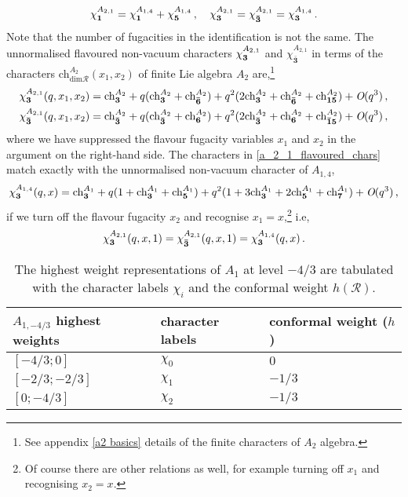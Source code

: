 \documentclass[a4paper,12pt]{article}
\begin{document}
\begin{equation}
    \chi_{\bf 1}^{A_{2,1}}=\chi_{\bf 1}^{A_{1,4}}+\chi_{\bf 5}^{A_{1,4}}\, ,\quad \chi_{\bf 3}^{A_{2,1}}=\chi_{\mathbf{\bar 3}}^{A_{2,1}}=\chi_{\bf 3}^{A_{1,4}}\, .
\end{equation}
Note that the number of fugacities in the identification is not the same. The unnormalised flavoured non-vacuum characters $\chi_{\bf 3}^{A_{2,1}}$ and $\chi_{\mathbf{\bar 3}}^{A_{2,1}}$ in terms of the characters $\mathrm{ch}^{A_2}_{\mathrm{dim}\mathcal{R}}(x_1,x_2)$ of finite Lie algebra $A_{2}$ are,\footnote{See appendix \ref{a2 basics} details of the finite characters of $A_2$ algebra.}
\begin{align}\label{a_2_1_flavoured_chars}
    \chi_{\bf 3}^{A_{2,1}}(q,x_1,x_2)&=\mathrm{ch}^{A_2}_{\bf 3}+q(\mathrm{ch}^{A_2}_{\bf 3}+\mathrm{ch}^{A_2}_{\mathbf{\bar 6}})+q^2(2\mathrm{ch}^{A_2}_{\bf 3}+\mathrm{ch}^{A_2}_{\mathbf{\bar 6}}+\mathrm{ch}^{A_2}_{\bf 15})+\textit{O}(q^3)\, ,\nonumber\\
    \chi_{\mathbf{\bar 3}}^{A_{2,1}}(q,x_1,x_2)&=\mathrm{ch}^{A_2}_{\mathbf{\bar 3}}+q(\mathrm{ch}^{A_2}_{\mathbf{\bar 3}}+\mathrm{ch}^{A_2}_{\bf 6})+q^2(2\mathrm{ch}^{A_2}_{\mathbf{\bar 3}}+\mathrm{ch}^{A_2}_{\bf 6}+\mathrm{ch}^{A_2}_{\mathbf{\bar 15}})+\textit{O}(q^3)\, ,
\end{align}
 where we have suppressed the flavour fugacity variables $x_1$ and $x_2$ in the argument on the right-hand side. The characters in \eqref{a_2_1_flavoured_chars} match exactly with the unnormalised non-vacuum character of $A_{1,4}$,
\begin{equation}
    \chi_{\bf 3}^{A_{1,4}}(q,x)=\mathrm{ch}^{A_1}_{\bf 3}+q(1+\mathrm{ch}^{A_1}_{\bf 3}+\mathrm{ch}^{A_1}_{\bf 5})+q^2(1+3\mathrm{ch}^{A_1}_{\bf 3}+ 2\mathrm{ch}^{A_1}_{\bf 5}+\mathrm{ch}^{A_1}_{\bf 7})+\textit{O}(q^3)\, ,
\end{equation}
if we turn off the flavour fugacity $x_2$ and recognise $x_1=x$,\footnote{Of course there are other relations as well, for example turning off $x_1$ and recognising $x_2=x$.} i.e,
\begin{equation}\label{a_1_4_flavoured_char}
    \chi_{\bf 3}^{A_{2,1}}(q,x,1)=\chi_{\mathbf{\bar 3}}^{A_{2,1}}(q,x,1)=\chi_{\bf 3}^{A_{1,4}}(q,x)\, .
\end{equation}
%
\begin{table}
\centering
\begin{tabularx}{0.8\textwidth} { 
  | >{\centering\arraybackslash}X 
  | >{\centering\arraybackslash}X 
  | >{\centering\arraybackslash}X | }
 \hline
 $A_{1,-4/3}$  highest weights & character labels & conformal weight ($h$) \\
\hline
$[-4/3;0]$  & $\chi_0$  & $0$ \\
\hline
$[-2/3;-2/3]$  & $\chi_1$  & $-1/3$ \\
\hline
$[0;-4/3]$  & $\chi_2$  & $-1/3$ \\
\hline
\end{tabularx}
\caption{The highest weight representations of $A_{1}$ at level $-4/3$ are tabulated with the character labels $\chi_i$ and the conformal weight $h(\mathcal{R})$.}
\label{table: A_1_43_reps}
\end{table}
\end{document}
